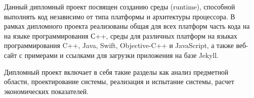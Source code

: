 Данный дипломный проект посвящен созданию среды (runtime), способной выполнять код независимо от типа платформы и архитектуры процессора.
В рамках дипломного проекта реализованы общая для всех платформ часть кода на на языке программирования С++, 
среды для различных платформ на языках программирования C++, Java, Swift, Objective-C++ и JavaScript, 
а также веб-сайт с примерами и ссылками для загрузки приложения на базе Jekyll.

Дипломный проект включает в себя такие разделы как
анализ предметной области,
проектирование системы,
реализация и испытание системы,
расчет экономических показателей.
